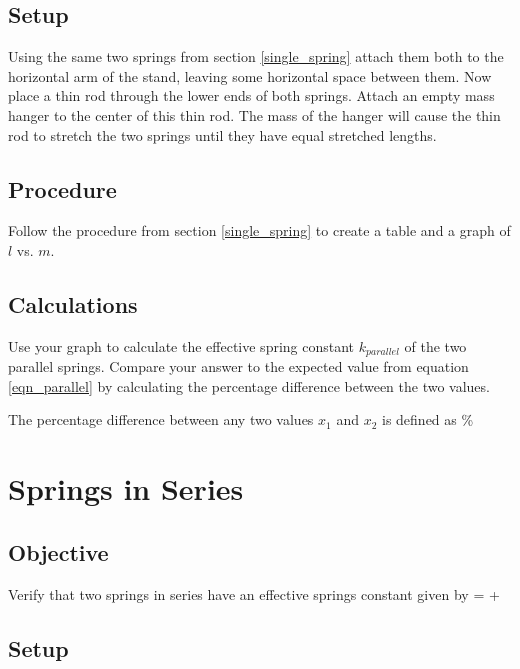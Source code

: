     \subsection*{Setup}

        Using the same two springs from section \ref{single_spring} attach them both to the horizontal arm of the stand, leaving some horizontal space between them. Now place a thin rod through the lower ends of both springs. Attach an empty mass hanger to the center of this thin rod. The mass of the hanger will cause the thin rod to stretch the two springs until they have equal stretched lengths.

        

    \subsection*{Procedure}

        Follow the procedure from section \ref{single_spring} to create a table and a graph of $l$ vs. $m$.

    \subsection*{Calculations}

        Use your graph to calculate the effective spring constant $k_{parallel}$ of the two parallel springs. Compare your answer to the expected value from equation \eqref{eqn_parallel} by calculating the percentage difference between the two values.

        The percentage difference between any two values $x_1$ and $x_2$ is defined as
        \beq \label{percentage_difference}
              \%
        \eeq


\section{Springs in Series}

    \subsection*{Objective}

        Verify that two springs in series have an effective springs constant given by
        \beq \label{series}
             =  + 
        \eeq

    \subsection*{Setup}


